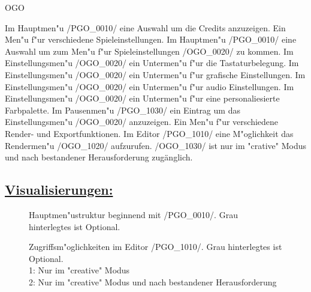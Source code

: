 \begin{ids}{\gls{OGO}}

	\id[0010] Im Hauptmen{"u} /PGO\_0010/ eine Auswahl um die Credits anzuzeigen.
	\id[0020] Ein Men{"u} f{"u}r verschiedene Spieleinstellungen.
	\id[0030] Im Hauptmen{"u} /PGO\_0010/ eine Auswahl um zum Men{"u} f{"u}r Spieleinstellungen /OGO\_0020/ zu kommen.
	\id[0040] Im Einstellungsmen{"u} /OGO\_0020/ ein Untermen{"u} f{"u}r die Tastaturbelegung.
	\id[0050] Im Einstellungsmen{"u} /OGO\_0020/ ein Untermen{"u} f{"u}r grafische Einstellungen.
	\id[0060] Im Einstellungsmen{"u} /OGO\_0020/ ein Untermen{"u} f{"u}r audio Einstellungen.
	\id[0070] Im Einstellungsmen{"u} /OGO\_0020/ ein Untermen{"u} f{"u}r eine personaliesierte Farbpalette.
	\id[1010] Im Pausenmen{"u} /PGO\_1030/ ein Eintrag um das Einstellungsmen{"u} /OGO\_0020/ anzuzeigen.
	\id[1020] Ein Men{"u} f{"u}r verschiedene Render- und Exportfunktionen.
	\id[1030] Im Editor /PGO\_1010/ eine M{"o}glichkeit das Rendermen{"u} /OGO\_1020/ aufzurufen.
	\id[1040] /OGO\_1030/ ist nur im "crative" Modus und nach bestandener Herausforderung zugänglich.
\end{ids}



%
%
%
\clearpage

\subsection*{\underline{Visualisierungen:}}

\begin{landscape}

	\begin{figure}[h]
		\centering
	 	
	 	\caption{Hauptmen{"u}struktur beginnend mit /PGO\_0010/. Grau hinterlegtes ist Optional.}
	\end{figure}
	
\end{landscape}

\clearpage

\begin{landscape}

	\begin{figure}[h]
		\centering
	 	
	 	\caption{Zugriffsm{"o}glichkeiten im Editor /PGO\_1010/. Grau hinterlegtes ist Optional.\\\hspace{\textwidth}
			1: Nur im "creative" Modus\\\hspace{\textwidth}
			2: Nur im "creative" Modus und nach bestandener Herausforderung}
		\label{fig:ingamemenu}
	\end{figure}
	
\end{landscape}
	

